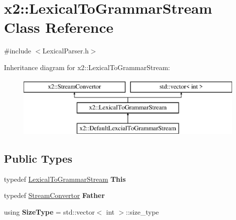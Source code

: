 \hypertarget{classx2_1_1_lexical_to_grammar_stream}{}\section{x2\+:\+:Lexical\+To\+Grammar\+Stream Class Reference}
\label{classx2_1_1_lexical_to_grammar_stream}


{\ttfamily \#include $<$Lexical\+Parser.\+h$>$}

Inheritance diagram for x2\+:\+:Lexical\+To\+Grammar\+Stream\+:\begin{figure}[H]
\begin{center}
\leavevmode
\includegraphics[height=3.000000cm]{classx2_1_1_lexical_to_grammar_stream}
\end{center}
\end{figure}
\subsection*{Public Types}
\begin{DoxyCompactItemize}
\item 
\mbox{\label{classx2_1_1_lexical_to_grammar_stream_a06ae6e58b3913bb1b693759831e0ba0d}} 
typedef \hyperlink{classx2_1_1_lexical_to_grammar_stream}{Lexical\+To\+Grammar\+Stream} {\bfseries This}
\item 
\mbox{\label{classx2_1_1_lexical_to_grammar_stream_a76f44ca6e2d0341489f6a2ab0680d5c4}} 
typedef \hyperlink{classx2_1_1_stream_convertor}{Stream\+Convertor} {\bfseries Father}
\item 
\mbox{\label{classx2_1_1_lexical_to_grammar_stream_a9acac6d22837802e8559d64ac827c799}} 
using {\bfseries Size\+Type} = std\+::vector$<$ int $>$\+::size\+\_\+type
\end{DoxyCompactItemize}
